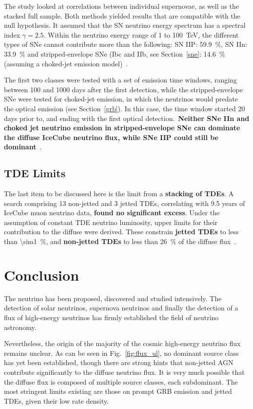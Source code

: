 The study looked at correlations between individual supernovae, as well as the stacked full sample. Both methods yielded results that are compatible with the null hypothesis. It assumed that the SN neutrino energy spectrum has a spectral index $\gamma=2.5$. Within the neutrino energy range of 1 to \SI{100}{\tera\eV}, the different types of SNe cannot contribute more than the following: SN IIP: \SI{59.9}{\percent}, SN IIn: \SI{33.9}{\percent} and stripped-envelope SNe (Ibc and IIb, see Section~\ref{sne}: \SI{14.6}{\percent} (assuming a choked-jet emission model)~\cite{Necker2023}.

The first two classes were tested with a set of emission time windows, ranging between 100 and 1000 days after the first detection, while the stripped-envelope SNe were tested for choked-jet emission, in which the neutrinos would predate the optical emission (see Section~\ref{grb}). In this case, the time window started 20 days prior to, and ending with the first optical detection.\ \textbf{Neither SNe IIn and choked jet neutrino emission in stripped-envelope SNe can dominate the diffuse IceCube neutrino flux, while SNe IIP could still be dominant}~\cite{Necker2023}.

\subsection{TDE Limits}
The last item to be discussed here is the limit from a \textbf{stacking of TDEs}. A search comprising 13 non-jetted and 3 jetted TDEs, correlating with 9.5 years of IceCube muon neutrino data, \textbf{found no significant excess}. Under the assumption of constant TDE neutrino luminosity, upper limits for their contribution to the diffuse were derived. These constrain \textbf{jetted TDEs} to less than \SI{\sim1}{\percent}, and \textbf{non-jetted TDEs} to less than \SI{26}{\percent} of the diffuse flux~.

\section{Conclusion}
The neutrino has been proposed, discovered and studied intensively. The detection of solar neutrinos, supernova neutrinos and finally the detection of a flux of high-energy neutrinos has firmly established the field of neutrino astronomy.

Nevertheless, the origin of the majority of the cosmic high-energy neutrino flux remains unclear. As can be seen in Fig.~\ref{fig:flux_ul}, no dominant source class has yet been established, though there are strong hints that non-jetted AGN contribute significantly to the diffuse neutrino flux. It is very much possible that the diffuse flux is composed of multiple source classes, each subdominant. The most stringent limits existing are those on prompt GRB emission and jetted TDEs, given their low rate density.

